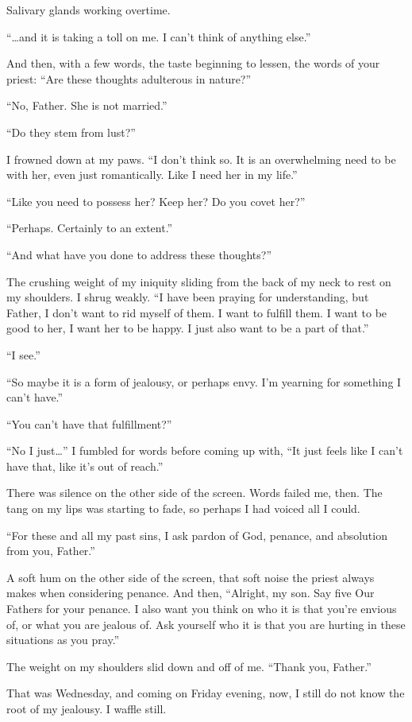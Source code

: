 Salivary glands working overtime.

``\ldots and it is taking a toll on me. I can't think of anything else.''

And then, with a few words, the taste beginning to lessen, the words of your priest: ``Are these thoughts adulterous in nature?''

``No, Father. She is not married.''

``Do they stem from lust?''

I frowned down at my paws. ``I don't think so. It is an overwhelming need to be with her, even just romantically. Like I need her in my life.''

``Like you need to possess her? Keep her? Do you covet her?''

``Perhaps. Certainly to an extent.''

``And what have you done to address these thoughts?''

The crushing weight of my iniquity sliding from the back of my neck to rest on my shoulders. I shrug weakly. ``I have been praying for understanding, but Father, I don't want to rid myself of them. I want to fulfill them. I want to be good to her, I want her to be happy. I just also want to be a part of that.''

``I see.''

``So maybe it is a form of jealousy, or perhaps envy. I'm yearning for something I can't have.''

``You can't have that fulfillment?''

``No I just\ldots{}'' I fumbled for words before coming up with, ``It just feels like I can't have that, like it's out of reach.''

There was silence on the other side of the screen. Words failed me, then. The tang on my lips was starting to fade, so perhaps I had voiced all I could.

``For these and all my past sins, I ask pardon of God, penance, and absolution from you, Father.''

A soft hum on the other side of the screen, that soft noise the priest always makes when considering penance. And then, ``Alright, my son. Say five Our Fathers for your penance. I also want you think on who it is that you're envious of, or what you are jealous of. Ask yourself who it is that you are hurting in these situations as you pray.''

The weight on my shoulders slid down and off of me. ``Thank you, Father.''

That was Wednesday, and coming on Friday evening, now, I still do not know the root of my jealousy. I waffle still.

